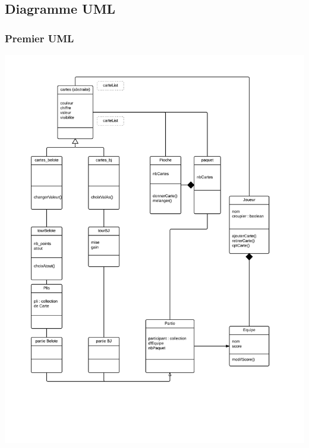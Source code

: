 \documentclass[a4paper]{report}
\begin{document}
\subsection{Diagramme UML}

\subsubsection{Premier UML}
\begin{center}
	\includegraphics[scale=0.6]{firstUML}
\end{center}

\newpage
\end{document}

